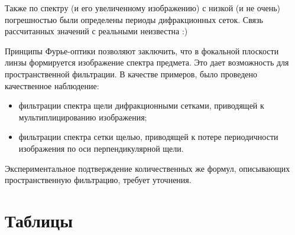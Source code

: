 \documentclass[a4paper,12pt]{article} %
\begin{document}
Также по спектру (и его увеличенному изображению) с низкой (и не очень) погрешностью были определены периоды дифракционных сеток. Связь рассчитанных значений с реальными неизвестна :)

Принципы Фурье-оптики позволяют заключить, что в фокальной плоскости линзы формируется изображение спектра предмета. Это дает возможность для пространственной фильтрации. В качестве примеров, было проведено качественное наблюдение:
\begin{itemize}
\item фильтрации спектра щели дифракционными сетками, приводящей к мультиплицированию изображения;
\item фильтрации спектра сетки щелью, приводящей к потере периодичности изображения по оси перпендикулярной щели. 
\end{itemize}

Экспериментальное подтверждение количественных же формул, описывающих пространственную фильтрацию, требует уточнения.

\newpage
\section{Таблицы}





\end{document}
